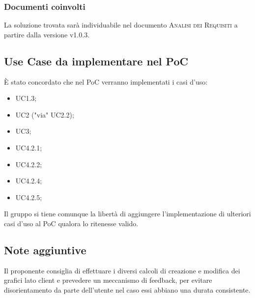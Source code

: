 \documentclass{article}
\begin{document}
\subsubsection*{Documenti coinvolti}
La soluzione trovata sar\`{a} individuabile nel documento \textsc{Analisi dei Requisiti} a partire dalla versione v1.0.3.

\subsection{Use Case da implementare nel PoC}
\label{itm:4}
\`{E} stato concordato che nel PoC verranno implementati i casi d'uso:
\begin{itemize}
	\item UC1.3;
	\item UC2 ("via" UC2.2);
	\item UC3;
	\item UC4.2.1;
	\item UC4.2.2;
	\item UC4.2.4;
	\item UC4.2.5;
\end{itemize}
Il gruppo si tiene comunque la libert\`{a} di aggiungere l'implementazione di ulteriori casi d'uso al PoC qualora lo ritenesse valido.
\subsection{Note aggiuntive}
\label{sub:note}
Il proponente consiglia di effettuare i diversi calcoli di creazione e modifica dei grafici lato client e prevedere un meccanismo di feedback,
per evitare disorientamento da parte dell'utente nel caso essi abbiano una durata consistente.
\end{document}
